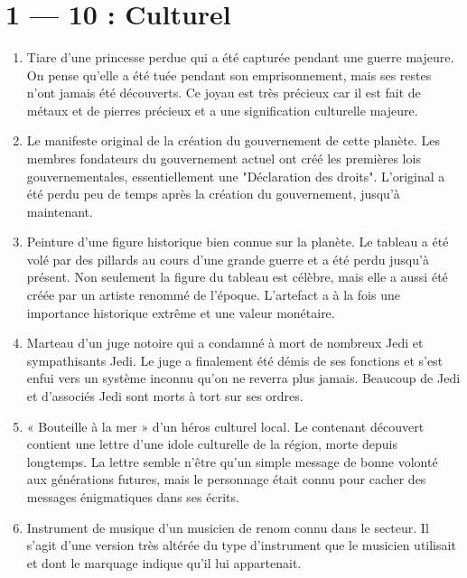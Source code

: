 \documentclass{article}
\begin{document}
\title{\vspace{-0.5cm}{\Huge Artefacts Star Wars} \vspace{-1cm}}

\date{}

\maketitle

\section*{1 --- 10 : Culturel}
\begin{enumerate}
	\item Tiare d'une princesse perdue qui a été capturée pendant une guerre majeure. On pense qu'elle a été tuée pendant son emprisonnement, mais ses restes n'ont jamais été découverts. Ce joyau est très précieux car il est fait de métaux et de pierres précieux et a une signification culturelle majeure.
	\item Le manifeste original de la création du gouvernement de cette planète. Les membres fondateurs du gouvernement actuel ont créé les premières lois gouvernementales, essentiellement une "Déclaration des droits". L'original a été perdu peu de temps après la création du gouvernement, jusqu'à maintenant.
	\item Peinture d'une figure historique bien connue sur la planète. Le tableau a été volé par des pillards au cours d'une grande guerre et a été perdu jusqu'à présent. Non seulement la figure du tableau est célèbre, mais elle a aussi été créée par un artiste renommé de l'époque. L'artefact a à la fois une importance historique extrême et une valeur monétaire.
	\item Marteau d'un juge notoire qui a condamné à mort de nombreux Jedi et sympathisants Jedi. Le juge a finalement été démis de ses fonctions et s'est enfui vers un système inconnu qu'on ne reverra plus jamais. Beaucoup de Jedi et d'associés Jedi sont morts à tort sur ses ordres.
	\item « Bouteille à la mer » d'un héros culturel local. Le contenant découvert contient une lettre d'une idole culturelle de la région, morte depuis longtemps. La lettre semble n'être qu'un simple message de bonne volonté aux générations futures, mais le personnage était connu pour cacher des messages énigmatiques dans ses écrits.
	\item Instrument de musique d'un musicien de renom connu dans le secteur. Il s'agit d'une version très altérée du type d'instrument que le musicien utilisait et dont le marquage indique qu'il lui appartenait.

\end{enumerate}
\end{document}
